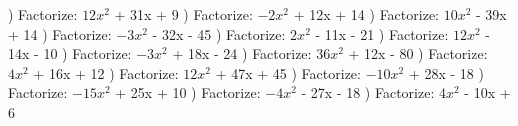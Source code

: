\documentclass{article}%
\begin{document}
\newline%
) Factorize: $12x^2$ + 31x + 9%
\newline%
\newline%
) Factorize: $-2x^2$ + 12x + 14%
\newline%
\newline%
) Factorize: $10x^2$ - 39x + 14%
\newline%
\newline%
) Factorize: $-3x^2$ - 32x - 45%
\newline%
\newline%
) Factorize: $2x^2$ - 11x - 21%
\newline%
\newline%
) Factorize: $12x^2$ - 14x - 10%
\newline%
\newline%
) Factorize: $-3x^2$ + 18x - 24%
\newline%
\newline%
) Factorize: $36x^2$ + 12x - 80%
\newline%
\newline%
) Factorize: $4x^2$ + 16x + 12%
\newline%
\newline%
) Factorize: $12x^2$ + 47x + 45%
\newline%
\newline%
) Factorize: $-10x^2$ + 28x - 18%
\newline%
\newline%
) Factorize: $-15x^2$ + 25x + 10%
\newline%
\newline%
) Factorize: $-4x^2$ - 27x - 18%
\newline%
\newline%
) Factorize: $4x^2$ - 10x + 6%
\newline%
\newline%
\end{document}
